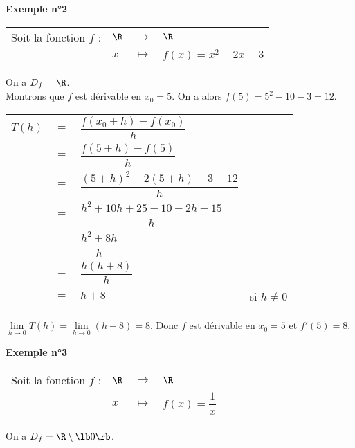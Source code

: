 \textbf{Exemple n°2} \\

\begin{tabular}{llll}
Soit la fonction $f$ : & $\R$ & $\longrightarrow$ & $\R$ \\
& $x$ & $\longmapsto$ & $f\left(x\right) = x^2 - 2x - 3$ \\
\end{tabular}

On a $D_f = \R$. \\

Montrons que $f$ est dérivable en $x_0 = 5$. On a alors $f(5) = 5^2 - 10 - 3 = 12$. \\

\begin{tabular}{llll}
$T(h)$ & $=$ & $\dfrac{f(x_0 + h) - f(x_0)}{h}$ & \vspace*{.3cm} \\
& $=$ & $\dfrac{f(5 + h) - f(5)}{h}$ & \vspace*{.3cm} \\
& $=$ & $\dfrac{(5+h)^2 - 2\left(5+h\right) - 3 - 12}{h}$ & \vspace*{.3cm} \\
& $=$ & $\dfrac{h^2 + 10h + 25 -10 -2h - 15}{h}$ & \vspace*{.3cm} \\
& $=$ & $\dfrac{h^2 + 8h}{h}$ & \vspace*{.3cm} \\
& $=$ & $\dfrac{h\left(h+ 8\right)}{h}$ & \vspace*{.3cm} \\
& $=$ & $ h + 8$ & si $h \neq 0$ \vspace*{.3cm} \\
\end{tabular}

$\lim\limits_{h \to 0} T(h) = \lim\limits_{h \to 0} (h + 8) = 8$. Donc $f$ est dérivable en $x_0 = 5$ et $f'(5) = 8$. 

\newpage

\textbf{Exemple n°3} \\

\begin{tabular}{llll}
Soit la fonction $f$ : & $\R$ & $\longrightarrow$ & $\R$ \\
& $x$ & $\longmapsto$ & $f\left(x\right) = \dfrac{1}{x}$ \\
\end{tabular}

On a $D_f = \R \setminus \lb 0 \rb$. \\

